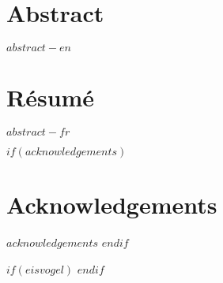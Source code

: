 



\cleardoublepage
\begin{minipage}{\linewidth}

\chapter*{Abstract}
$abstract-en$


\newpage
\chapter*{Résumé}
$abstract-fr$

\end{minipage}
\cleardoublepage



$if(acknowledgements)$
\chapter*{Acknowledgements}
$acknowledgements$
$endif$


\cleardoublepage

$if(eisvogel)$
\pagestyle{eisvogel-header-footer}
\lhead[\leftmark]{}
\rhead[]{\rightmark}
$endif$


